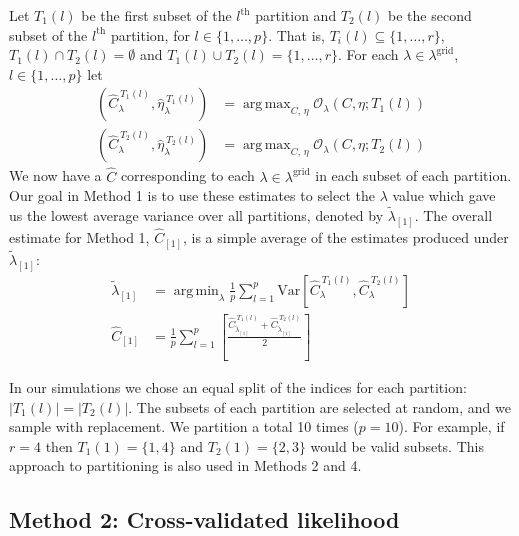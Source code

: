 \documentclass[12pt]{article}
\DeclareMathOperator*{\argmin}{arg\,min}
\DeclareMathOperator*{\argmax}{arg\,max}
\newcommand{\lambdagrid}{\lambda^{\text{grid}}}
\theoremstyle{break}
\theoremstyle{break}
\begin{document}
Let $T_1(l)$ be the first subset of the $l^{\text{th}}$ partition and $T_2(l)$ be the second subset of the $l^{\text{th}}$ partition, for $l \in \{1, \dots , p\}$. That is, $T_i(l) \subseteq \{1, \dots , r\}$, $T_1(l) \cap T_2(l) = \emptyset$ and $T_1(l) \cup T_2(l) = \{1, \dots ,r\}$.
For each $\lambda \in \lambda^{\text{grid}}$, $l \in \{1, \dots, p\}$ let
\begin{align}
\left(\widehat{C}_{\lambda}^{ \ T_1(l)}, \widehat{\eta}_{\lambda}^{ \ T_1(l)} \right) &= \argmax_{C, \, \eta} \mathcal{O}_\lambda \left(C, \eta; T_1(l) \right) \\
\left(\widehat{C}_{\lambda}^{ \ T_2(l)}, \widehat{\eta}_{\lambda}^{ \ T_2(l)} \right) &= \argmax_{C, \, \eta} \mathcal{O}_\lambda \left(C, \eta; T_2(l) \right)
\end{align}
We now have a $\widehat{C}$ corresponding to each $\lambda \in \lambdagrid$ in each subset of each partition.  Our goal in Method 1 is to use these estimates to select the $\lambda$ value which gave us the lowest average variance over all partitions, denoted by $\widetilde{\lambda}_{[1]}$.  The overall estimate for Method 1, $\widehat{C}_{[1]}$, is a simple average of the estimates produced under $\widetilde{\lambda}_{[1]}$:
\begin{align}
\widetilde{\lambda}_{[1]} &= \argmin_{\lambda} \frac{1}{p} \sum_{l=1}^p \text{Var}\left[ \widehat{C}_{\lambda}^{ \ T_1(l)}, \widehat{C}_{\lambda}^{ \ T_2(l)} \right] \\
\widehat{C}_{[1]} &=  \frac{1}{p} \sum_{l=1}^p \left[ \frac{\widehat{C}_{\widetilde{\lambda}_{[1]}}^{ \ T_1(l)} + \widehat{C}_{\widetilde{\lambda}_{[1]}}^{ \ T_2(l)}}{2} \right]
\end{align}

In our simulations we chose an equal split of the indices for each partition: $|T_1(l)| = |T_2(l)|$.  The subsets of each partition are selected at random, and we sample with replacement.  We partition a total 10 times ($p = 10$).  For example, if $r = 4$ then $T_1(1) = \{1,4\}$ and $T_2(1) = \{2, 3\}$ would be valid subsets.  This approach to partitioning is also used in Methods 2 and 4.

\subsection{Method 2: Cross-validated likelihood}

\end{document}
